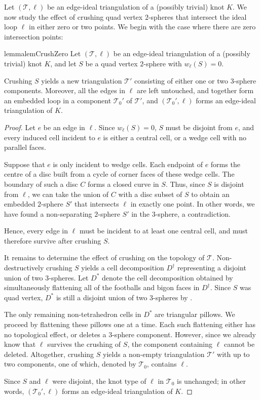 \documentclass[10pt,a4paper]{amsart}
\newcommand{\tri}{\mathcal{T}}
\begin{document}
Let $(\tri,\ell)$ be an edge-ideal triangulation of a (possibly trivial) knot $K$.
We now study the effect of crushing quad vertex $2$-spheres that intersect the ideal loop $\ell$ in either zero or two points.
We begin with the case where there are zero intersection points:

\begin{restatable}{lemma}{lemCrushZero}\label{lem:crushW=0}
Let $(\tri,\ell)$ be an edge-ideal triangulation of a (possibly trivial) knot $K$, and let $S$ be a quad vertex $2$-sphere with $w_\ell(S)=0$.

Crushing $S$ yields a new triangulation $\tri'$ consisting of either one or two $3$-sphere components. Moreover, all the edges in $\ell$ are left untouched, and together form an embedded loop in a component $\tri_0'$ of $\tri'$, and $(\tri_0',\ell)$ forms an edge-ideal triangulation of $K$.
\end{restatable}

\begin{proof}
Let $e$ be an edge in $\ell$.
Since $w_\ell(S)=0$, $S$ must be disjoint from $e$, and every induced cell incident to $e$ is either a central cell, or a wedge cell with no parallel faces.

Suppose that $e$ is only incident to wedge cells.
Each endpoint of $e$ forms the centre of a disc built from a cycle of corner faces of these wedge cells.
The boundary of such a disc $C$ forms a closed curve in $S$.
Thus, since $S$ is disjoint from $\ell$, we can take the union of $C$ with a disc subset of $S$
to obtain an embedded $2$-sphere $S'$ that intersects $\ell$ in exactly one point.
In other words, we have found a non-separating $2$-sphere $S'$ in the $3$-sphere, a contradiction.

Hence, every edge in $\ell$ must be incident to at least one central cell, and must therefore survive after crushing $S$.

It remains to determine the effect of crushing on the topology of $\tri$.
Non-destructively crushing $S$ yields a cell decomposition $D^\dagger$ representing a disjoint union of two $3$-spheres.
Let $D^\ast$ denote the cell decomposition obtained by simultaneously flattening all of the footballs and bigon faces in $D^\dagger$.
Since $S$ was quad vertex, $D^\ast$ is still a disjoint union of two $3$-spheres by .

The only remaining non-tetrahedron cells in $D^\ast$ are triangular pillows.
We proceed by flattening these pillows one at a time.
Each such flattening either has no topological effect, or deletes a $3$-sphere component.
However, since we already know that $\ell$ survives the crushing of $S$, the component containing $\ell$ cannot be deleted. Altogether, crushing $S$ yields a non-empty triangulation $\tri'$ with up to two components, one of which, denoted by $\tri_0$, contains $\ell$.

Since $S$ and $\ell$ were disjoint, the knot type of $\ell$ in $\tri_0$ is unchanged;
in other words, $(\tri_0',\ell)$ forms an edge-ideal triangulation of $K$.
\end{proof}
\end{document}
